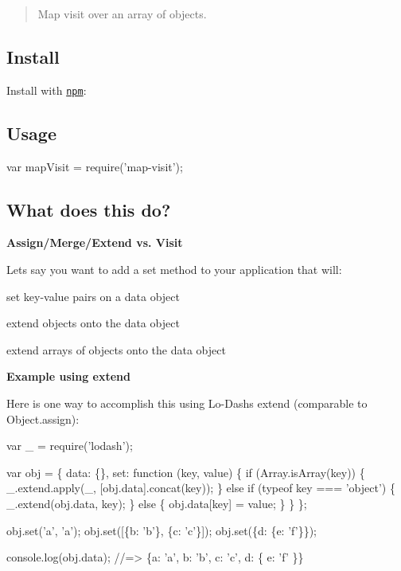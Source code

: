 \begin{quote}
Map {\ttfamily visit} over an array of objects. \end{quote}


\subsection*{Install}

Install with \href{https://www.npmjs.com/}{\tt npm}\+:




\subsection*{Usage}


\begin{DoxyCode}
var mapVisit = require('map-visit');
\end{DoxyCode}


\subsection*{What does this do?}

{\bfseries Assign/\+Merge/\+Extend vs. Visit}

Let\textquotesingle{}s say you want to add a {\ttfamily set} method to your application that will\+:


\begin{DoxyItemize}
\item set key-\/value pairs on a {\ttfamily data} object
\item extend objects onto the {\ttfamily data} object
\item extend arrays of objects onto the data object
\end{DoxyItemize}

{\bfseries Example using {\ttfamily extend}}

Here is one way to accomplish this using Lo-\/\+Dash\textquotesingle{}s {\ttfamily extend} (comparable to {\ttfamily Object.\+assign})\+:


\begin{DoxyCode}
var \_ = require('lodash');

var obj = \{
  data: \{\},
  set: function (key, value) \{
    if (Array.isArray(key)) \{
      \_.extend.apply(\_, [obj.data].concat(key));
    \} else if (typeof key === 'object') \{
      \_.extend(obj.data, key);
    \} else \{
      obj.data[key] = value;
    \}
  \}
\};

obj.set('a', 'a');
obj.set([\{b: 'b'\}, \{c: 'c'\}]);
obj.set(\{d: \{e: 'f'\}\});

console.log(obj.data);
//=> \{a: 'a', b: 'b', c: 'c', d: \{ e: 'f' \}\}
\end{DoxyCode}


